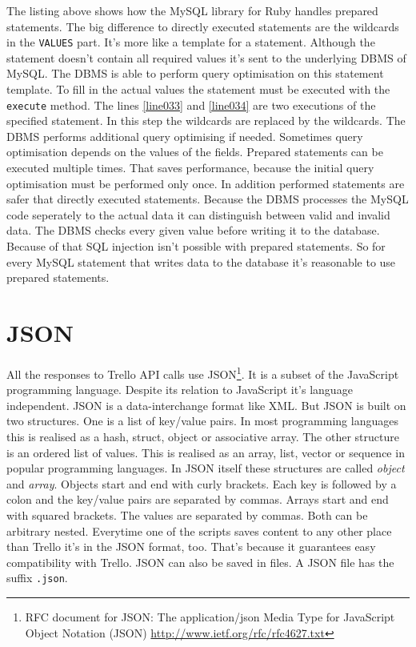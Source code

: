 The listing above shows how the MySQL library for Ruby handles prepared statements. The big difference to directly executed statements are the wildcards in the \lstinline{VALUES} part. It's more like a template for a statement. Although the statement doesn't contain all required values it's sent to the underlying DBMS of MySQL. The DBMS is able to perform query optimisation on this statement template. To fill in the actual values the statement must be executed with the \lstinline{execute} method. The lines \ref{line033} and \ref{line034} are two executions of the specified statement. In this step the wildcards are replaced by the wildcards. The DBMS performs additional query optimising if needed. Sometimes query optimisation depends on the values of the fields. Prepared statements can be executed multiple times. That saves performance, because the initial query optimisation must be performed only once. In addition performed statements are safer that directly executed statements. Because the DBMS processes the MySQL code seperately to the actual data it can distinguish between valid and invalid data. The DBMS checks every given value before writing it to the database. Because of that SQL injection isn't possible with prepared statements. So for every MySQL statement that writes data to the database it's reasonable to use prepared statements. \cite{mysql:rubydoc}


\section{JSON}\label{jsonsec}
All the responses to Trello API calls use JSON\footnote{RFC document for JSON: The application/json Media Type for JavaScript Object Notation (JSON)  \url{http://www.ietf.org/rfc/rfc4627.txt}}. It is a subset of the JavaScript programming language. Despite its relation to JavaScript it's language independent. JSON is a data-interchange format like XML. But JSON is built on two structures. One is a list of key/value pairs. In most programming languages this is realised as a hash, struct, object or associative array. The other structure is an ordered list of values. This is realised as an array, list, vector or sequence in popular programming languages. In JSON itself these structures are called \emph{object} and \emph{array}. Objects start and end with curly brackets. Each key is followed by a colon and the key/value pairs are separated by commas. Arrays start and end with squared brackets. The values are separated by commas. Both can be arbitrary nested. Everytime one of the scripts saves content to any other place than Trello it's in the JSON format, too. That's because it guarantees easy compatibility with Trello. JSON can also be saved in files. A JSON file has the suffix \texttt{.json}. \cite{json}

